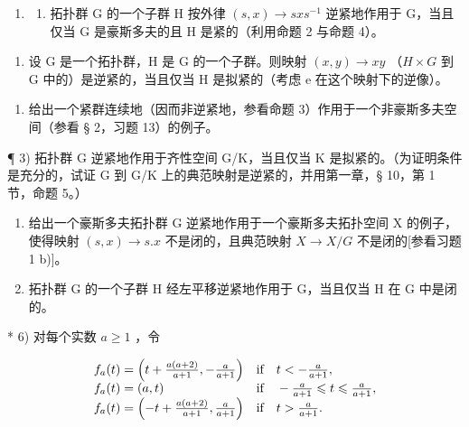 \begin{enumerate}
\def\labelenumi{\arabic{enumi})}
\tightlist
\item
  \begin{enumerate}
  \def\labelenumii{\alph{enumii})}
  \tightlist
  \item
    拓扑群 G 的一个子群 H 按外律 \((s, x) \rightarrow sxs^{-1}\) 逆紧地作用于 G，当且仅当 G 是豪斯多夫的且 H 是紧的（利用命题 2 与命题 4）。
  \end{enumerate}
\end{enumerate}

\begin{enumerate}
\def\labelenumi{\alph{enumi})}
\setcounter{enumi}{1}
\tightlist
\item
  设 G 是一个拓扑群，H 是 G 的一个子群。则映射 \((x,y)\to xy\) （\(H\times G\) 到 G 中的）是逆紧的，当且仅当 H 是拟紧的（考虑 e 在这个映射下的逆像）。
\end{enumerate}

\begin{enumerate}
\def\labelenumi{\arabic{enumi})}
\setcounter{enumi}{1}
\tightlist
\item
  给出一个紧群连续地（因而非逆紧地，参看命题 3）作用于一个非豪斯多夫空间（参看 § 2，习题 13）的例子。
\end{enumerate}

¶ 3) 拓扑群 G 逆紧地作用于齐性空间 G/K，当且仅当 K 是拟紧的。（为证明条件是充分的，试证 G 到 G/K 上的典范映射是逆紧的，并用第一章，§ 10，第 1 节，命题 5。）

\begin{enumerate}
\def\labelenumi{\arabic{enumi})}
\setcounter{enumi}{3}
\item
  给出一个豪斯多夫拓扑群 G 逆紧地作用于一个豪斯多夫拓扑空间 X 的例子，使得映射 \((s, x) \rightarrow s.x\) 不是闭的，且典范映射 \(X \rightarrow X/G\) 不是闭的{[}参看习题 1 b){]}。
\item
  拓扑群 G 的一个子群 H 经左平移逆紧地作用于 G，当且仅当 H 在 G 中是闭的。
\end{enumerate}

* 6) 对每个实数 \(a \geqslant 1\) ，令

\[
\begin{array}{l l} f _ {a} (t) = \left(t + \frac {a (a + 2)}{a + 1}, - \frac {a}{a + 1}\right) & \text {if} \quad t <   - \frac {a}{a + 1}, \\ f _ {a} (t) = (a, t) & \text {if} \quad - \frac {a}{a + 1} \leqslant t \leqslant \frac {a}{a + 1}, \\ f _ {a} (t) = \left(- t + \frac {a (a + 2)}{a + 1}, \frac {a}{a + 1}\right) & \text {if} \quad t > \frac {a}{a + 1}. \end{array}
\]


